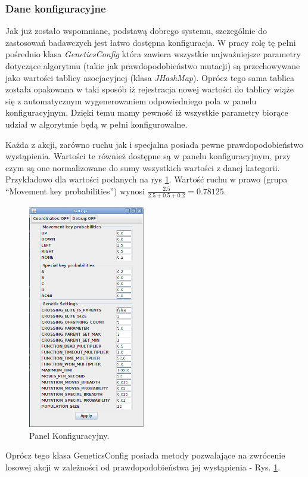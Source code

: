 \subsubsection{Dane konfiguracyjne}
\begin{par}
	Jak już zostało wspomniane, podstawą dobrego systemu, szczególnie do zastosowań badawczych jest łatwo dostępna konfiguracja. 
	W pracy rolę tę pełni pośrednio klasa \textit{GeneticsConfig} która zawiera wszystkie najważniejsze parametry dotyczące algorytmu (takie jak prawdopodobieństwo mutacji) są przechowywane jako wartości tablicy asocjacyjnej (klasa \textit{JHashMap}). 
	Oprócz tego sama tablica została opakowana w taki sposób iż rejestracja nowej wartości do tablicy wiąże się z automatycznym wygenerowaniem odpowiedniego pola w panelu konfiguracyjnym. 
	Dzięki temu mamy pewność iż wszystkie parametry biorące udział w algorytmie będą w pełni konfigurowalne.
\end{par}
\begin{par}
	Każda z akcji, zarówno ruchu jak i specjalna posiada pewne prawdopodobieństwo wystąpienia.
	Wartości te również dostępne są w panelu konfiguracyjnym, przy czym są one normalizowane do sumy wszystkich wartości z danej kategorii.
	Przykładowo dla wartości podanych na rys \ref{fig:config1}. Wartość ruchu w prawo (grupa ``Movement key probabilities'') wynosi $\frac{2.5}{2.5+0.5+0.2}=0.78125$.
	\begin{figure}[!h]
		\centering
		\includegraphics[width=2in]{obrazki/config1.png}
		\caption{Panel Konfiguracyjny.}
		\label{fig:config1}
	\end{figure}
	Oprócz tego klasa GeneticsConfig posiada metody pozwalające na zwrócenie losowej akcji w zależności od prawdopodobieństwa jej wystąpienia - Rys. \ref{fig:config1}.
\end{par}
